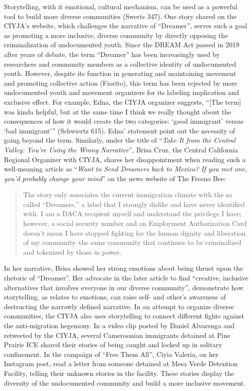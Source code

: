 \documentclass[12pt]{article}
\begin{document}
\begin{flushleft}
Storytelling, with it emotional, cultural mechanism, can be used as a powerful tool to build more diverse communities (Swerts 347). %
One story shared on the CIYJA's website, which challenges the narrative of ``Dreamer'', serves such a goal as promoting a more inclusive, diverse community by directly opposing the criminalization of undocumented youth.
Since the DREAM Act passed in 2019 after years of debate, the term ``Dreamer'' has been increasingly used by researchers and community members as a collective identity of undocumented youth. However, despite its function in generating and maintaining movement and promoting collective action (Fiorito), this term has been rejected by more undocumented youth and movement organizers for its labeling implication and exclusive effect. For example, Edna, the CIYJA organizer suggests, ``[The term] was kinda helpful, but at the same time I think we really thought about the consequences of how it would create the two categories: `good immigrant' versus `bad immigrant''' (Schwiertz 615). Edna' statement point out the necessity of going beyond the term. Similarly, under the title of ``\textit{Take It from the Central Valley: You're Using the Wrong Narrative}'', Brisa Cruz, the Central California Regional Organizer with CIYJA, shares her disappointment when reading such a well-meaning article as ``\textit{Want to Send Dreamers back to Mexico? If you met one, you'd probably change your mind}'' on the news website of The Fresno Bee: 

\begin{quotation}
    \noindent
    The story only associates the current immigration climate with the so called ``Dreamers,'' a label that I strongly dislike and have never identified with.
    I am a DACA recipient myself and understand the privilege I have; however, a social security number and an Employment Authorization Card doesn't mean I have stopped fighting for the human dignity and liberation of my community--the same community that continues to be criminalized and tokenized by those in power.
\end{quotation} %

\noindent
In her narrative, Brisa showed her strong emotions about being thrust upon the rhetoric of ``Dreamer''. Her advocate in the later article to find ``creative, inclusive alternatives that involves everyone in our diverse community'', demonstrate how storytelling, as relates to emotions, can raise self- and other's awareness of destructing the narrowly defined narrative. In an attempt to organize diverse communities, the CIYJA also uses storytelling to connect different fights against the anti-migration hegemony. In a video clip posted by Daniel Alvarenga and retweeted by the CIYJA, several Cameroonian immigrants detained at Pine Prairie ICE shared their stories of being caught and locked up in solitary confinement. In the campaign of ``Free Them All'', Ciyia Valeria, on her Instagram post, read a letter from someone detained at Mesa Verde Detention Facility, telling their unknown stories in the facility. These stories display the diversity of the undocumented community and build a more inclusive movement. 


\end{flushleft}
\end{document}
